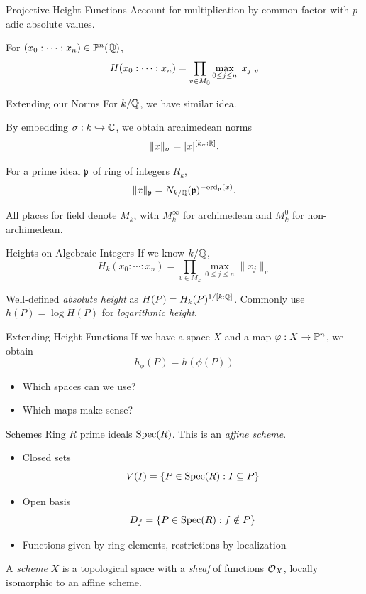 \documentclass{beamer}
\begin{document}
\begin{frame}{Projective Height Functions}
    Account for multiplication by common factor with $p$-adic absolute values.

    For $(x_0 : \cdots : x_n) \in \mathbb{P}^n(\mathbb{Q})$,
    \[
        H(x_0 : \cdots : x_n)
        = \prod_{v \in M_{\mathbb{Q}}} \max_{0 \leq j \leq n} |x_j|_v
    \]
\end{frame}

\begin{frame}{Extending our Norms}
    For $k/\mathbb{Q}$, we have similar idea.

    By embedding $\sigma : k \hookrightarrow \mathbb{C}$, we obtain archimedean norms
    \[
        \|x\|_\sigma = |x|^{[k_\sigma : \mathbb{R}]}.
    \]

    For a prime ideal $\mathfrak{p}$ of ring of integers $R_k$,
    \[
        \|x\|_{\mathfrak{p}} = N_{k/\mathbb{Q}}(\mathfrak{p})^{-{\rm ord}_{\mathfrak{p}}(x)}.
    \]

    All places for field denote $M_k$,
    with $M_k^\infty$ for archimedean and $M_k^0$ for non-archimedean.
\end{frame}

\begin{frame}{Heights on Algebraic Integers}
    If we know $k/\mathbb{Q}$,
    \[
        H_k(x_0 : \cdots : x_n) = 
            \prod_{v \in M_k} \max_{0 \leq j \leq n} \|x_j\|_v
    \]

    Well-defined \textit{absolute height} as $H(P) = H_k(P)^{1/[k : \mathbb{Q}]}$.
    Commonly use $h(P) = \log H(P)$ for \textit{logarithmic height}.
\end{frame}

\begin{frame}{Extending Height Functions}
    If we have a space $X$ and a map $\varphi : X \to \mathbb{P}^n$,
    we obtain
    \[
        h_\phi(P) = h(\phi(P))
    \]

    \begin{itemize}
        \item Which spaces can we use?
        \item Which maps make sense?
    \end{itemize}
\end{frame}

\begin{frame}{Schemes}
    Ring $R$ prime ideals ${\rm Spec}(R)$.
    This is an \textit{affine scheme}.

    \begin{itemize}
        \item Closed sets
        \[
            V(I) = \{ P \in {\rm Spec}(R) : I \subseteq P \}
        \]
        \item Open basis
        \[
            D_f = \{ P \in {\rm Spec}(R) : f \notin P \}
        \]
        \item Functions given by ring elements,
        restrictions by localization 
    \end{itemize}

    \begin{definition}
    A \textit{scheme} $X$ is a topological space with a \textit{sheaf} of functions $\mathcal{O}_X$,
    locally isomorphic to an affine scheme.
    \end{definition}
\end{frame}
\end{document}
